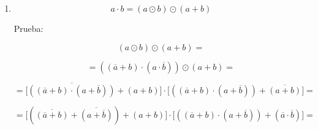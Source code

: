 \begin{enumerate}
\begin{enumerate}
\begin{enumerate}
\begin{enumerate}
        Prueba:

        \[{({a \oplus b})} \oplus {{({a \cdot b})} =}\]

        \[{= {({{({\overline{a} \cdot b})} + {({a \cdot \overline{b}})}})}} \oplus {{({a \cdot b})} =}\]

        \[{= {{\lbrack{\overline{({{({\overline{a}\cdot b})}+{({a\cdot\overline{b}})}})} \cdot {({a \cdot b})}}\rbrack} + {\lbrack{{({{({\overline{a} \cdot b})} + {({a \cdot \overline{b}})}})} \cdot \overline{({a\cdot b})}}\rbrack}}} =\]

        \[{= {{\lbrack{{({\overline{({\overline{a}\cdot b})} \cdot \overline{({a\cdot\overline{b}})}})} \cdot {({a \cdot b})}}\rbrack} + {\lbrack{{({{({\overline{a} \cdot b})} + {({a \cdot \overline{b}})}})} \cdot {({\overline{a} + \overline{b}})}}\rbrack}}} =\]

        \[{= {{\lbrack{{({{({a + \overline{b}})} \cdot {({\overline{a} + b})}})} \cdot {({a \cdot b})}}\rbrack} + {\lbrack{{({{({\overline{a} \cdot b})} + {({a \cdot \overline{b}})}})} \cdot {({\overline{a} + \overline{b}})}}\rbrack}}} =\]

        \[{= {{\lbrack{({a \cdot b})}\rbrack} + {\lbrack{({{({\overline{a} \cdot b})} + {({a \cdot \overline{b}})}})}\rbrack}}} =\]

        \[{= {{{({a \cdot b})} + {({\overline{a} \cdot b})}} + {({a \cdot \overline{b}})}}} =\]

        \[{= {{\lbrack{{({a \cdot b})} + {({\overline{a} \cdot b})}}\rbrack} + {\lbrack{{({a \cdot b})} + {({a \cdot \overline{b}})}}\rbrack}}} =\]

        \[{= {{\lbrack b\rbrack} + {\lbrack a\rbrack}}} =\]

        \[= {a + b}\]
      \item
        \[{{a \cdot b} = {({a \odot b})}} \odot {({a + b})}\]

        Prueba:

        \[{({a \odot b})} \odot {{({a + b})} =}\]

        \[{= {({{({\overline{a} + b})} \cdot {({a \cdot \overline{b}})}})}} \odot {{({a + b})} =}\]

        \[{= {{\lbrack{\overline{({{({\overline{a}+b})}\cdot{({a+\overline{b}})}})} + {({a + b})}}\rbrack} \cdot {\lbrack{{({{({\overline{a} + b})} \cdot {({a + \overline{b}})}})} + \overline{({a+b})}}\rbrack}}} =\]

        \[{= {{\lbrack{{({\overline{({\overline{a}+b})} + \overline{({a+\overline{b}})}})} + {({a + b})}}\rbrack} \cdot {\lbrack{{({{({\overline{a} + b})} \cdot {({a + \overline{b}})}})} + {({\overline{a} \cdot \overline{b}})}}\rbrack}}} =\]


\end{enumerate}
\end{enumerate}
\end{enumerate}
\end{enumerate}
